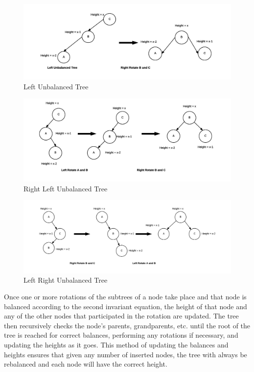\documentclass[12pt]{article}
\begin{document}
\noindent
\begin{figure}[h]
\caption{Left Unbalanced Tree}
\includegraphics[width=15cm]{left_unbalanced_tree.png}
\centering
\end{figure}
\noindent
\begin{figure}[h]
\caption{Right Left Unbalanced Tree}
\includegraphics[width=15cm]{right_left_unbalanced_tree.png}
\centering
\end{figure}
\noindent
\begin{figure}[h]
\caption{Left Right Unbalanced Tree}
\includegraphics[width=15cm]{left_right_unbalanced_tree.png}
\centering
\end{figure}
\noindent
Once one or more rotations of the subtrees of a node take place and that node
is balanced according to the second invariant equation, the height of that node
and any of the other nodes that participated in the rotation are updated.  The
tree then recursively checks the node's parents, grandparents, etc. 
until the root of the tree is reached for correct balances, performing any 
rotations if necessary, and updating the heights as it goes.  This method of
updating the balances and heights ensures that given any number of inserted
nodes, the tree with always be rebalanced and each node will
have the correct height.
\end{document}
